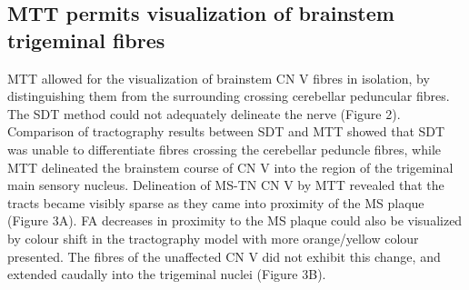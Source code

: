 \subsection{MTT permits visualization of brainstem trigeminal fibres}
MTT allowed for the visualization of brainstem CN V fibres in isolation, by distinguishing them from the surrounding crossing cerebellar peduncular fibres. The SDT method could not adequately delineate the nerve (Figure 2). Comparison of tractography results between SDT and MTT showed that SDT was unable to differentiate fibres crossing the cerebellar peduncle fibres, while MTT delineated the brainstem course of CN V into the region of the trigeminal main sensory nucleus. Delineation of MS-TN CN V by MTT revealed that the tracts became visibly sparse as they came into proximity of the MS plaque (Figure 3A). FA decreases in proximity to the MS plaque could also be visualized by colour shift in the tractography model with more orange/yellow colour presented. The fibres of the unaffected CN V did not exhibit this change, and extended caudally into the trigeminal nuclei (Figure 3B). 

